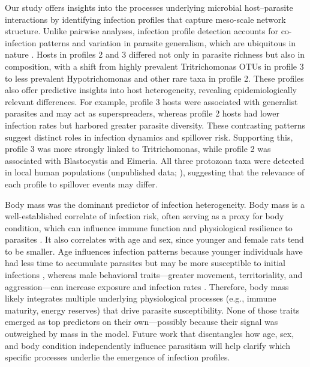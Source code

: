 \documentclass[oneside, a4paper, onecolumn, 11pt]{article}
\begin{document}
Our study offers insights into the processes underlying microbial host–parasite interactions by identifying infection profiles that capture meso-scale network structure. Unlike pairwise analyses, infection profile detection accounts for co-infection patterns and variation in parasite generalism, which are ubiquitous in nature \citep{Hoarau2020-uc, Park2018-uf}. Hosts in profiles 2 and 3 differed not only in parasite richness but also in composition, with a shift from highly prevalent Tritrichomonas OTUs in profile 3 to less prevalent Hypotrichomonas and other rare taxa in profile 2. These profiles also offer predictive insights into host heterogeneity, revealing epidemiologically relevant differences. For example, profile 3 hosts were associated with generalist parasites and may act as superspreaders, whereas profile 2 hosts had lower infection rates but harbored greater parasite diversity. These contrasting patterns suggest distinct roles in infection dynamics and spillover risk. Supporting this, profile 3 was more strongly linked to Tritrichomonas, while profile 2 was associated with Blastocystis and Eimeria. All three protozoan taxa were detected in local human populations (unpublished data; \citep{Barrett2024-nc}), suggesting that the relevance of each profile to spillover events may differ.

Body mass was the dominant predictor of infection heterogeneity. Body mass is a well-established correlate of infection risk, often serving as a proxy for body condition, which can influence immune function and physiological resilience to parasites \citep{Sanchez2018-tf}. It also correlates with age and sex, since younger and female rats tend to be smaller. Age influences infection patterns because younger individuals have had less time to accumulate parasites but may be more susceptible to initial infections \citep{Santin2023-yk}, whereas male behavioral traits---greater movement, territoriality, and aggression---can increase exposure and infection rates \citep{Grear2009-ch}. Therefore, body mass likely integrates multiple underlying physiological processes (e.g., immune maturity, energy reserves) that drive parasite susceptibility. None of those traits emerged as top predictors on their own---possibly because their signal was outweighed by mass in the model. Future work that disentangles how age, sex, and body condition independently influence parasitism will help clarify which specific processes underlie the emergence of infection profiles.
\end{document}
